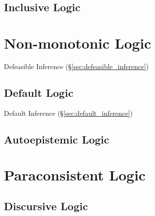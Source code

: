 \subsection{Inclusive Logic}\label{sec:inclusive_logic}



\section{Non-monotonic Logic}\label{sec:nonmonotonic_logic}

Defeasible Inference (\S\ref{sec:defeasible_inference})



\subsection{Default Logic}\label{sec:default_logic}

Default Inference (\S\ref{sec:default_inference})



\subsection{Autoepistemic Logic}\label{sec:autoepistemic_logic}



\section{Paraconsistent Logic}\label{sec:paraconsistent_logic}

\subsection{Discursive Logic}\label{sec:discursive_logic}

